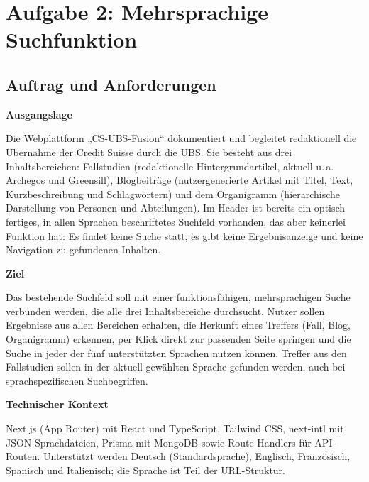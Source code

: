 \documentclass[11pt,a4paper]{article}
\newcommand{\minihead}[1]{\par\needspace{5\baselineskip}\noindent\textbf{#1}\par\nobreak}
\let\oldsubsection\subsection
\renewcommand{\subsection}{\needspace{6\baselineskip}\oldsubsection}
\begin{document}
\section{Aufgabe 2: Mehrsprachige Suchfunktion}

\subsection{Auftrag und Anforderungen}
\minihead{Ausgangslage}
Die Webplattform „CS-UBS-Fusion“ dokumentiert und begleitet redaktionell die Übernahme der Credit Suisse durch die UBS. Sie besteht aus drei Inhaltsbereichen: Fallstudien (redaktionelle Hintergrundartikel, aktuell u.\,a. Archegos und Greensill), Blogbeiträge (nutzergenerierte Artikel mit Titel, Text, Kurzbeschreibung und Schlagwörtern) und dem Organigramm (hierarchische Darstellung von Personen und Abteilungen). Im Header ist bereits ein optisch fertiges, in allen Sprachen beschriftetes Suchfeld vorhanden, das aber keinerlei Funktion hat: Es findet keine Suche statt, es gibt keine Ergebnisanzeige und keine Navigation zu gefundenen Inhalten.

\minihead{Ziel}
Das bestehende Suchfeld soll mit einer funktionsfähigen, mehrsprachigen Suche verbunden werden, die alle drei Inhaltsbereiche durchsucht. Nutzer sollen Ergebnisse aus allen Bereichen erhalten, die Herkunft eines Treffers (Fall, Blog, Organigramm) erkennen, per Klick direkt zur passenden Seite springen und die Suche in jeder der fünf unterstützten Sprachen nutzen können. Treffer aus den Fallstudien sollen in der aktuell gewählten Sprache gefunden werden, auch bei sprachspezifischen Suchbegriffen.

\minihead{Technischer Kontext}
Next.js (App Router) mit React und TypeScript, Tailwind CSS, next-intl mit JSON-Sprachdateien, Prisma mit MongoDB sowie Route Handlers für API-Routen. Unterstützt werden Deutsch (Standardsprache), Englisch, Französisch, Spanisch und Italienisch; die Sprache ist Teil der URL-Struktur.
\end{document}

